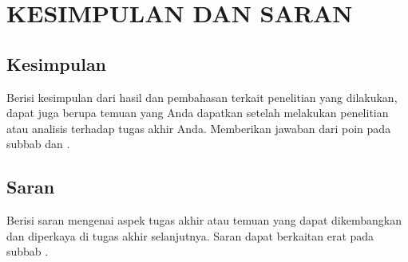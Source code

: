 \newpage
\chapter{KESIMPULAN DAN SARAN} \label{Bab V}

\section{Kesimpulan} \label{V.Kesimpulan}
Berisi kesimpulan dari hasil dan pembahasan terkait penelitian yang dilakukan, dapat juga berupa temuan yang Anda dapatkan setelah melakukan penelitian atau analisis terhadap tugas akhir Anda. Memberikan jawaban dari poin pada subbab  dan . \par

\section{Saran} \label{V.Saran}
Berisi saran mengenai aspek tugas akhir atau temuan yang dapat dikembangkan dan diperkaya di tugas akhir selanjutnya. Saran dapat berkaitan erat pada subbab . \par
